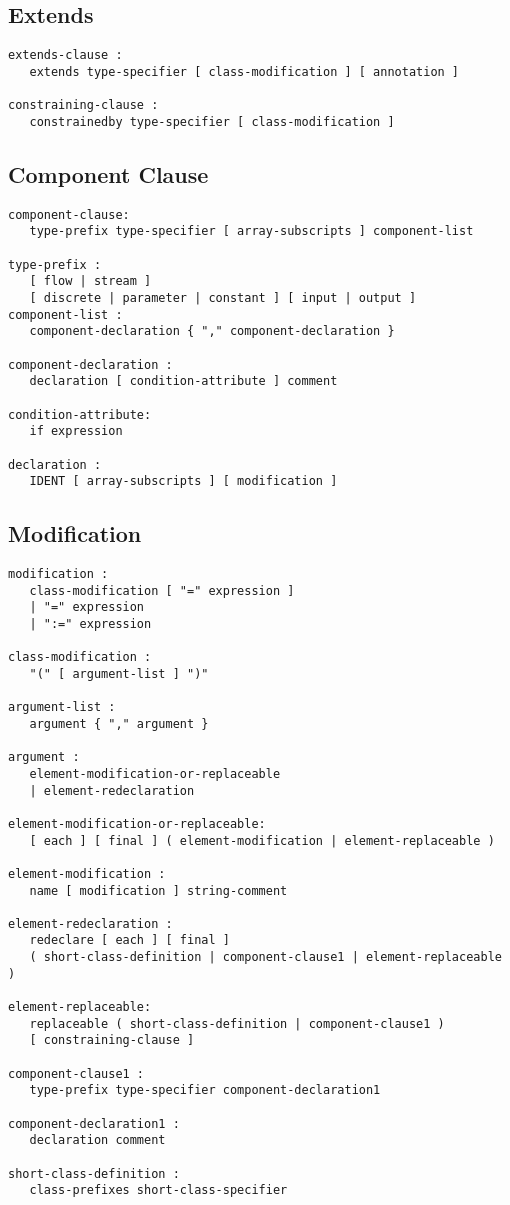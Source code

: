 \subsection{Extends}
\begin{lstlisting}[language=grammar]
extends-clause :
   extends type-specifier [ class-modification ] [ annotation ]

constraining-clause :
   constrainedby type-specifier [ class-modification ]
\end{lstlisting}

\subsection{Component Clause}
\begin{lstlisting}[language=grammar]
component-clause:
   type-prefix type-specifier [ array-subscripts ] component-list

type-prefix :
   [ flow | stream ]
   [ discrete | parameter | constant ] [ input | output ]
component-list :
   component-declaration { "," component-declaration }

component-declaration :
   declaration [ condition-attribute ] comment

condition-attribute:
   if expression

declaration :
   IDENT [ array-subscripts ] [ modification ]
\end{lstlisting}

\subsection{Modification}
\begin{lstlisting}[language=grammar]
modification :
   class-modification [ "=" expression ]
   | "=" expression
   | ":=" expression

class-modification :
   "(" [ argument-list ] ")"

argument-list :
   argument { "," argument }

argument :
   element-modification-or-replaceable
   | element-redeclaration

element-modification-or-replaceable:
   [ each ] [ final ] ( element-modification | element-replaceable )

element-modification :
   name [ modification ] string-comment

element-redeclaration :
   redeclare [ each ] [ final ]
   ( short-class-definition | component-clause1 | element-replaceable )

element-replaceable:
   replaceable ( short-class-definition | component-clause1 )
   [ constraining-clause ]

component-clause1 :
   type-prefix type-specifier component-declaration1

component-declaration1 :
   declaration comment

short-class-definition :
   class-prefixes short-class-specifier
\end{lstlisting}

